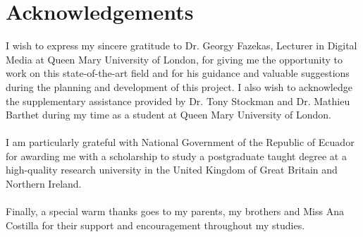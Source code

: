 \section*{Acknowledgements}
I wish to express my sincere gratitude to Dr. Georgy Fazekas, Lecturer in Digital Media at Queen Mary University of London, for giving me the opportunity to work on this state-of-the-art field and for his guidance and valuable suggestions during the planning and development of this project. I also wish to acknowledge the supplementary assistance provided by Dr. Tony Stockman and Dr. Mathieu Barthet during my time as a student at Queen Mary University of London.
\\
\\
I am particularly grateful with National Government of the Republic of Ecuador for awarding me with a scholarship to study a postgraduate taught degree at a high-quality research university in the United Kingdom of Great Britain and Northern Ireland.
\\
\\
Finally, a special warm thanks goes to my parents, my brothers and Miss Ana Costilla for their support and encouragement throughout my studies.